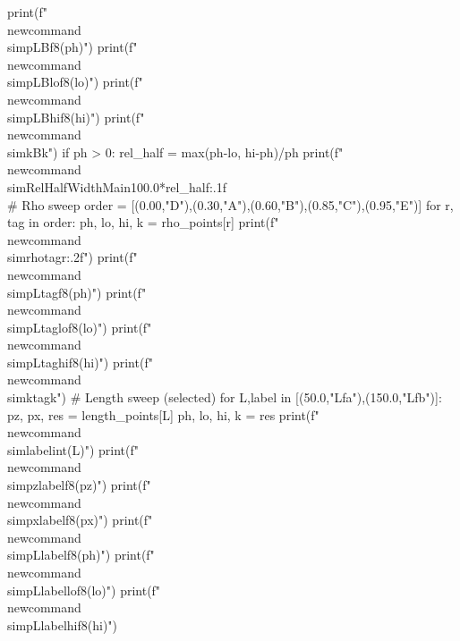     print(f"\\newcommand{{\\simpLB}}{{{f8(ph)}}}")
    print(f"\\newcommand{{\\simpLBlo}}{{{f8(lo)}}}")
    print(f"\\newcommand{{\\simpLBhi}}{{{f8(hi)}}}")
    print(f"\\newcommand{{\\simkB}}{{{k}}}")
    if ph > 0:
        rel_half = max(ph-lo, hi-ph)/ph
        print(f"\\newcommand{{\\simRelHalfWidthMain}}{{{100.0*rel_half:.1f}\\%
    # Rho sweep
    order = [(0.00,"D"),(0.30,"A"),(0.60,"B"),(0.85,"C"),(0.95,"E")]
    for r, tag in order:
        ph, lo, hi, k = rho_points[r]
        print(f"\\newcommand{{\\simrho{tag}}}{{{r:.2f}}}")
        print(f"\\newcommand{{\\simpL{tag}}}{{{f8(ph)}}}")
        print(f"\\newcommand{{\\simpL{tag}lo}}{{{f8(lo)}}}")
        print(f"\\newcommand{{\\simpL{tag}hi}}{{{f8(hi)}}}")
        print(f"\\newcommand{{\\simk{tag}}}{{{k}}}")
    # Length sweep (selected)
    for L,label in [(50.0,"Lfa"),(150.0,"Lfb")]:
        pz, px, res = length_points[L]
        ph, lo, hi, k = res
        print(f"\\newcommand{{\\sim{label}}}{{{int(L)}}}")
        print(f"\\newcommand{{\\simpz{label}}}{{{f8(pz)}}}")
        print(f"\\newcommand{{\\simpx{label}}}{{{f8(px)}}}")
        print(f"\\newcommand{{\\simpL{label}}}{{{f8(ph)}}}")
        print(f"\\newcommand{{\\simpL{label}lo}}{{{f8(lo)}}}")
        print(f"\\newcommand{{\\simpL{label}hi}}{{{f8(hi)}}}")
}}
